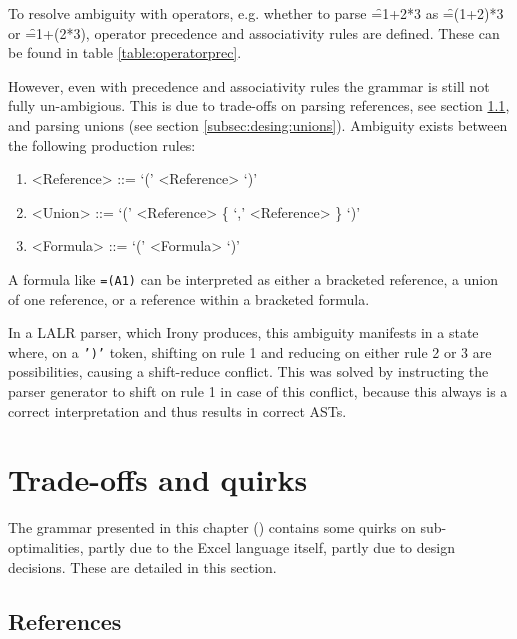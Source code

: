 To resolve ambiguity with operators, e.g. whether to parse \f{=1+2*3} as \f{=(1+2)*3} or \f{=1+(2*3)}, operator precedence and associativity rules are defined.
These can be found in table \ref{table:operatorprec}.

However, even with precedence and associativity rules the grammar is still not fully un-ambigious.
This is due to trade-offs on parsing references, see section \ref{tradeoff:references}, and parsing unions (see section \ref{subsec:desing:unions}).
Ambiguity exists between the following production rules:
\begin{enumerate}
	\item \begin{grammar}<Reference> ::= `(' <Reference> `)'\end{grammar}
	\item \begin{grammar}<Union> ::= `(' <Reference> \{ `,' <Reference> \} `)'\end{grammar}
	\item \begin{grammar}<Formula> ::= `(' <Formula> `)'\end{grammar}
\end{enumerate}

A formula like \texttt{=(A1)} can be interpreted as either a bracketed reference, a union of one reference, or a reference within a bracketed formula.

In a LALR parser, which Irony produces, this ambiguity manifests in a state where, on a \texttt{')'} token, shifting on rule 1 and reducing on either rule 2 or 3 are possibilities, causing a shift-reduce conflict.
This was solved by instructing the parser generator to shift on rule 1 in case of this conflict, because this always is a correct interpretation and thus results in correct ASTs.

\section{Trade-offs and quirks}

The grammar presented in this chapter () contains some quirks on sub-optimalities, partly due to the Excel language itself, partly due to design decisions.
These are detailed in this section.

\subsection{References}
\label{tradeoff:references}

